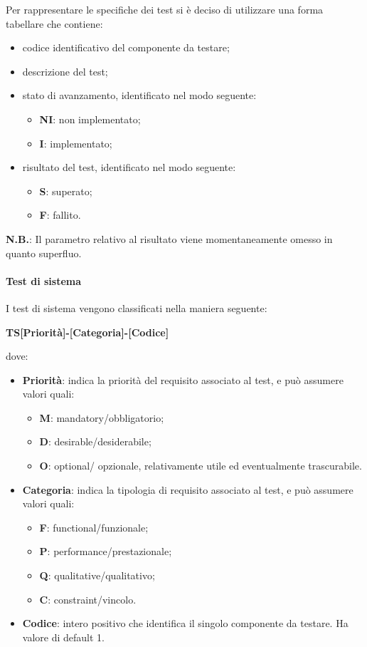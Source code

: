 		Per rappresentare le specifiche dei test si è deciso di utilizzare una forma tabellare che contiene:
		\begin{itemize}
			\item codice identificativo del componente da testare;
			\item descrizione del test;
			\item stato di avanzamento, identificato nel modo seguente:
				\begin{itemize}
					\item \textbf{NI}: non implementato;
					\item \textbf{I}: implementato;						
				\end{itemize}		
			\item risultato del test, identificato nel modo seguente:
				\begin{itemize}
					\item \textbf{S}: superato;
					\item \textbf{F}: fallito.
				\end{itemize}
		\end{itemize}	
		\textbf{N.B.}: Il parametro relativo al risultato viene momentaneamente omesso in quanto superfluo.						 
					
		
		\paragraph{Test di sistema}
		I test di sistema vengono classificati nella maniera seguente:
		\begin{center}
			\textbf{TS[Priorità]-[Categoria]-[Codice]}
		\end{center}		 
		dove:\\
		\begin{itemize}
			\item \textbf{Priorità}: indica la priorità del requisito associato al test, e può assumere valori quali:
			\begin{itemize}
				\item \textbf{M}: mandatory/obbligatorio;
				\item \textbf{D}: desirable/desiderabile;
				\item \textbf{O}: optional/ opzionale, relativamente utile ed eventualmente trascurabile.
			\end{itemize}
			\item \textbf{Categoria}: indica la tipologia di requisito associato al test, e può assumere valori quali:
			\begin{itemize}
				\item \textbf{F}: functional/funzionale;
				\item \textbf{P}: performance/prestazionale;
				\item \textbf{Q}: qualitative/qualitativo;
				\item \textbf{C}: constraint/vincolo.
			\end{itemize}
			\item \textbf{Codice}: intero positivo che identifica il singolo componente da testare. Ha valore di default 1.
		\end{itemize}
		 
